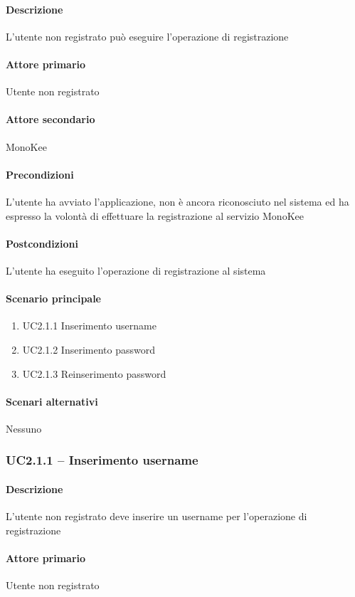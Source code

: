\paragraph{Descrizione}  L’utente non registrato può eseguire l’operazione di registrazione 
\paragraph{Attore primario}  Utente non registrato
\paragraph{Attore secondario}  MonoKee
\paragraph{Precondizioni}  L’utente ha avviato l’applicazione, non è ancora riconosciuto nel sistema ed ha espresso la volontà di effettuare la registrazione al servizio MonoKee
\paragraph{Postcondizioni}  L’utente ha eseguito l’operazione di registrazione al sistema
\paragraph{Scenario principale}  
    \begin{enumerate}
        \item UC2.1.1 Inserimento username
        \item UC2.1.2 Inserimento password
        \item UC2.1.3 Reinserimento password
    \end{enumerate}
\paragraph{Scenari alternativi}  Nessuno



\subsubsection{UC2.1.1 – Inserimento username}
\paragraph{Descrizione}  L’utente non registrato deve inserire un username per l’operazione di registrazione
\paragraph{Attore primario}  Utente non registrato
